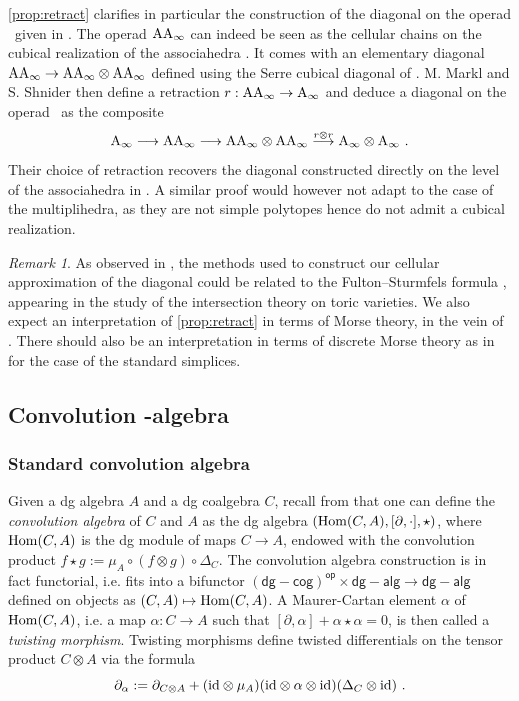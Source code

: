 \documentclass[twoside, 11pt]{amsart}
\theoremstyle{remark}
\newtheorem{remark}[definition]{\sc Remark}
\begin{document}
\cref{prop:retract} clarifies in particular the construction of the diagonal on the operad \Ainf\ given in \cite{MarklShnider06}. 
The operad $\mathrm{AA}_\infty$ can indeed be seen as the cellular chains on the cubical realization of the associahedra \cite[Section 9.3.1]{LodayVallette12}. 
It comes with an elementary diagonal $\mathrm{AA}_\infty \rightarrow \mathrm{AA}_\infty \otimes \mathrm{AA}_\infty$ defined using the Serre cubical diagonal of \cite{Serre51}.
M. Markl and S. Shnider then define a retraction $r:\mathrm{AA}_\infty \rightarrow \mathrm{A}_\infty$ and deduce a diagonal on the operad \Ainf\ as the composite
\[ \mathrm{A}_\infty \longrightarrow \mathrm{AA}_\infty \longrightarrow \mathrm{AA}_\infty \otimes \mathrm{AA}_\infty \overset{r \otimes r}{\longrightarrow} \mathrm{A}_\infty \otimes \mathrm{A}_\infty \ . \]
Their choice of retraction recovers the diagonal constructed directly on the level of the associahedra in \cite[Theorem 2]{MTTV19}.
A similar proof would however not adapt to the case of the multiplihedra, as they are not simple polytopes hence do not admit a cubical realization.

\begin{remark}
\label{rem:Morse}
As observed in \cite[Remark 1.6]{LA21}, the methods used to construct our cellular approximation of the diagonal could be related to the Fulton--Sturmfels formula \cite[Theorem 4.2]{FultonSturmfels97}, appearing in the study of the intersection theory on toric varieties.
We also expect an interpretation of \cref{prop:retract} in terms of Morse theory, in the vein of \cite{FriedmanMardonesSinha21,Frankland07}. 
There should also be an interpretation in terms of discrete Morse theory as in \cite[Section 1.1.4]{Thorngren18} for the case of the standard simplices.  
\end{remark}

\subsection{Convolution \Ainf -algebra} \label{ss:conv-ainf-alg}

\subsubsection{Standard convolution algebra}

Given a dg algebra $A$ and a dg coalgebra $C$, recall from  \cite[Section 1.6]{LodayVallette12} that one can define the \textit{convolution algebra} of $C$ and $A$ as the dg algebra $(\mathrm{Hom} (C,A) , [ \partial , \cdot ] , \star)$, where $\mathrm{Hom} (C,A)$
is the dg module of maps $C \rightarrow A$, endowed with the convolution product $f \star g := \mu_A \circ ( f \otimes g) \circ \Delta_C$. 
The convolution algebra construction is in fact functorial, i.e. fits into a bifunctor $\mathsf{(dg-cog)^{op}} \times \mathsf{dg-alg} \rightarrow \mathsf{dg-alg}$ defined on objects as $(C,A) \mapsto \mathrm{Hom} (C,A)$.
A Maurer-Cartan element $\alpha$ of $\mathrm{Hom} (C,A)$, i.e. a map $\alpha : C \rightarrow A$ such that 
$[ \partial , \alpha ] + \alpha \star \alpha  = 0$,
is then called a \emph{twisting morphism}. 
Twisting morphisms define twisted differentials on the tensor product $C \otimes A$ via the formula
\[ \partial_\alpha := \partial_{C \otimes A} + (\mathrm{id} \otimes \mu_A ) ( \mathrm{id} \otimes \alpha \otimes \mathrm{id} ) ( \Delta_C \otimes \mathrm{id} ) \ . \]
\end{document}
